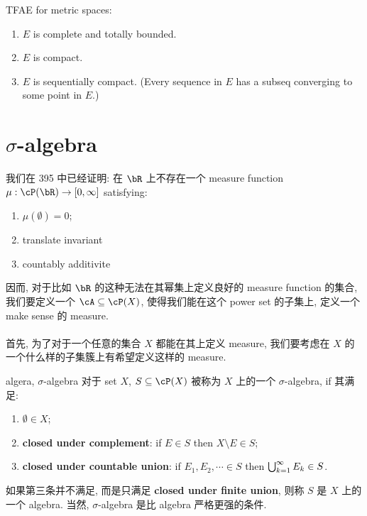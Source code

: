 \documentclass[lang=cn,11pt]{elegantbook}
\begin{document}
\begin{theorem}
    TFAE for metric spaces:
    \begin{enumerate}
        \item $E$ is complete and totally bounded.
        \item $E$ is compact.
        \item $E$ is sequentially compact. (Every sequence in $E$ has a subseq converging to some point in $E$.)
    \end{enumerate}
\end{theorem}


\chapter{$\sigma$-algebra}
\noindent 我们在 395 中已经证明: 在 $\bR$ 上不存在一个 measure function $\mu : \cP(\bR) \rar [0,\infty]$ satisfying:
\begin{enumerate}
    \item $\mu(\emptyset) = 0$;
    \item translate invariant
    \item countably additivite
\end{enumerate}

\noindent 因而, 对于比如 $\bR$ 的这种无法在其幂集上定义良好的 measure function 的集合, 我们要定义一个 $\cA \sub \cP(X)$, 使得我们能在这个 power set 的子集上, 定义一个 make sense 的 measure.\\\\
\noindent 
首先, 为了对于一个任意的集合 $X$ 都能在其上定义 measure, 我们要考虑在 $X$ 的一个什么样的子集簇上有希望定义这样的 measure. 

\begin{definition}{algera, $\sigma$-algebra}
对于 set $X$, $S \sub \cP(X)$ 被称为 $X$ 上的一个 $\sigma$-algebra, if 其满足:
\begin{enumerate}
    \item $\emptyset \in X$;
    \item \textbf{closed under complement}: if $E \in S$ then $X \setminus E \in S$;
    \item \textbf{closed under countable union}: if $E_1,E_2,\cdots \in S$ then $\bigcup_{k=1}^\infty E_k \in S$.
\end{enumerate}
如果第三条并不满足, 而是只满足 \textbf{closed under finite union}, 则称 $S$ 是 $X$ 上的一个 algebra. 当然, $\sigma$-algebra 是比 algebra 严格更强的条件.
\end{definition}
\end{document}
